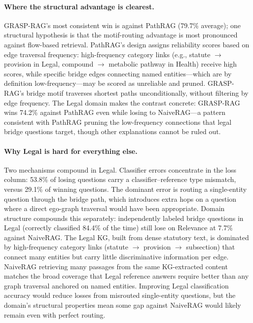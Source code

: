 \paragraph{Where the structural advantage is clearest.}
GRASP-RAG's most consistent win is against PathRAG (79.7\% average); one
structural hypothesis is that the motif-routing advantage is most pronounced
against flow-based retrieval.
PathRAG's design assigns reliability scores based on edge traversal frequency:
high-frequency category links (e.g., statute $\to$ provision in Legal,
compound $\to$ metabolic pathway in Health) receive high scores, while
specific bridge edges connecting named entities---which are by definition
low-frequency---may be scored as unreliable and pruned.
GRASP-RAG's bridge motif traverses shortest paths unconditionally, without
filtering by edge frequency.
The Legal domain makes the contrast concrete: GRASP-RAG wins 74.2\% against
PathRAG even while losing to NaiveRAG---a pattern consistent with PathRAG
pruning the low-frequency connections that legal bridge questions target,
though other explanations cannot be ruled out.

\paragraph{Why Legal is hard for everything else.}
Two mechanisms compound in Legal.
Classifier errors concentrate in the loss column: 53.8\% of losing questions
carry a classifier--reference type mismatch, versus 29.1\% of winning questions.
The dominant error is routing a single-entity question through the bridge
path, which introduces extra hops on a question where a direct ego-graph
traversal would have been appropriate.
Domain structure compounds this separately: independently labeled bridge questions in Legal
(correctly classified 84.4\% of the time) still lose on Relevance at 7.7\%
against NaiveRAG.
The Legal KG, built from dense statutory text, is dominated by high-frequency
category links (statute $\to$ provision $\to$ subsection) that connect many
entities but carry little discriminative information per edge.
NaiveRAG retrieving many passages from the same KG-extracted content matches
the broad coverage that Legal reference answers require better than any
graph traversal anchored on named entities.
Improving Legal classification accuracy would reduce losses from misrouted
single-entity questions, but the domain's structural properties mean some gap
against NaiveRAG would likely remain even with perfect routing.

